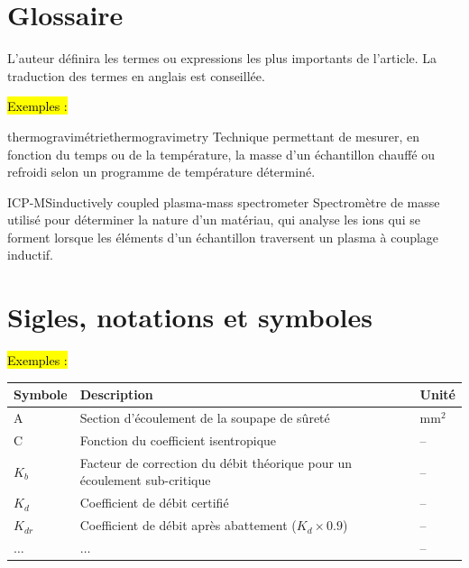 \documentclass[a4paper,12pt]{article}
\begin{document}
\section*{Glossaire}
L'auteur d\'efinira les termes ou expressions les plus importants de l'article. La traduction des termes en anglais est conseill\'ee.\newline

\hl{Exemples : }\newline

\begin{Glossaire}{thermogravim\'etrie}{thermogravimetry}
	Technique permettant de mesurer, en fonction du temps ou de la temp\'erature, la masse d'un \'echantillon chauff\'e ou refroidi selon un programme de temp\'erature d\'etermin\'e.
\end{Glossaire}

\begin{Acronyme}{ICP-MS}{inductively coupled plasma-mass spectrometer}
	Spectrom\`etre de masse utilis\'e pour d\'eterminer la nature d'un mat\'eriau, qui analyse les ions qui se forment lorsque les \'el\'ements d'un \'echantillon traversent un plasma \`a couplage inductif.
\end{Acronyme}



\section*{Sigles, notations et symboles}
\hl{Exemples : }\newline

\begin{table}[h]
	\centering
	\begin{tabular}{|p{}|p{}|p{}|}
		\hline
		\textbf{Symbole} & \textbf{Description} & \textbf{Unit\'e}\\
		\hline
		A 	& Section d'\'ecoulement de la soupape de s\^uret\'e		& mm$^2$\\
		\hline
		C 	& Fonction du coefficient isentropique		& -- \\
		\hline
		$K_b$ 	& Facteur de correction du d\'ebit th\'eorique pour un \'ecoulement sub-critique		& -- \\
		\hline
		$K_d$ 	& Coefficient de d\'ebit certifi\'e		& -- \\
		\hline
		$K_{dr}$ 	& Coefficient de d\'ebit apr\`es abattement ($K_d \times 0.9$)		& -- \\
		\hline
		$\ldots$ 	& $\ldots$		& -- \\
		\hline
	\end{tabular}
	\label{tab:tabsignes}
\end{table}
\end{document}
